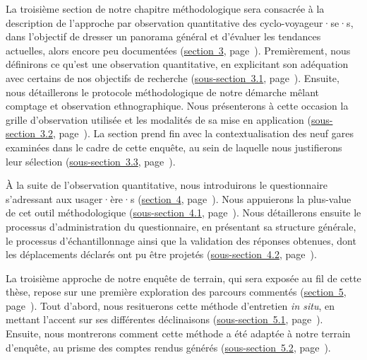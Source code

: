 \begin{refsegment}
La troisième section de notre chapitre méthodologique sera consacrée à la description de l’approche par observation quantitative des cyclo-voyageur·se·s, dans l’objectif de dresser un panorama général et d’évaluer les tendances actuelles, alors encore peu documentées (\hyperref[chap3:observation-quantitative]{section~3}, page~\pageref{chap3:observation-quantitative}). Premièrement, nous définirons ce qu’est une observation quantitative, en explicitant son adéquation avec certains de nos objectifs de recherche (\hyperref[chap3:observation-quantitative-outil-adapte]{sous-section~3.1}, page~\pageref{chap3:observation-quantitative-outil-adapte}). Ensuite, nous détaillerons le protocole méthodologique de notre démarche mêlant comptage et observation ethnographique. Nous présenterons à cette occasion la grille d’observation utilisée et les modalités de sa mise en application (\hyperref[chap3:methodologie-observation-quantitative]{sous-section~3.2}, page~\pageref{chap3:methodologie-observation-quantitative}). La section prend fin avec la contextualisation des neuf gares examinées dans le cadre de cette enquête, au sein de laquelle nous justifierons leur sélection (\hyperref[chap3:observation-quantitative-gares-examinees]{sous-section~3.3}, page~\pageref{chap3:observation-quantitative-gares-examinees}).%

À la suite de l’observation quantitative, nous introduirons le questionnaire s’adressant aux usager·ère·s (\hyperref[chap3:questionnaire]{section~4}, page~\pageref{chap3:questionnaire}). Nous appuierons la plus-value de cet outil méthodologique (\hyperref[chap3:apports-questionnaire-usagers]{sous-section~4.1}, page~\pageref{chap3:apports-questionnaire-usagers}). Nous détaillerons ensuite le processus d’administration du questionnaire, en présentant sa structure générale, le processus d’échantillonnage ainsi que la validation des réponses obtenues, dont les déplacements déclarés ont pu être projetés (\hyperref[chap3:administration-questionnaire-usagers]{sous-section~4.2}, page~\pageref{chap3:administration-questionnaire-usagers}).%

La troisième approche de notre enquête de terrain, qui sera exposée au fil de cette thèse, repose sur une première exploration des parcours commentés (\hyperref[chap3:parcours-commente]{section~5}, page~\pageref{chap3:parcours-commente}). Tout d'abord, nous resituerons cette méthode d’entretien \textsl{in situ}, en mettant l’accent sur ses différentes déclinaisons (\hyperref[chap3:parcours-commente-definition]{sous-section~5.1}, page~\pageref{chap3:parcours-commente-definition}). Ensuite, nous montrerons comment cette méthode a été adaptée à notre terrain d’enquête, au prisme des comptes rendus  générés (\hyperref[chap3:parcours-commente-administration-participants]{sous-section~5.2}, page~\pageref{chap3:parcours-commente-administration-participants}).%


\end{refsegment}
